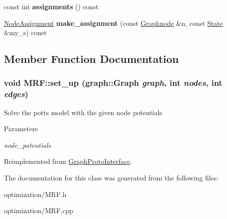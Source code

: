 \begin{DoxyCompactItemize}
\item 
\hypertarget{classMRF_aaf17c4a671ea4f06553c33fca90bfa35}{
const int {\bfseries assignments} () const }
\label{classMRF_aaf17c4a671ea4f06553c33fca90bfa35}

\item 
\hypertarget{classMRF_a9326b3fd5aea915a1bb8a1ad2ac50f3f}{
\hyperlink{structNodeAssignment}{NodeAssignment} {\bfseries make\_\-assignment} (const \hyperlink{classScarab_1_1Graph_1_1Graphnode}{Graphnode} \&n, const \hyperlink{structState}{State} \&my\_\-s) const }
\label{classMRF_a9326b3fd5aea915a1bb8a1ad2ac50f3f}

\end{DoxyCompactItemize}


\subsection{Member Function Documentation}
\hypertarget{classMRF_a928f19f948fa97796462fd9542a985fd}{
\subsubsection[{set\_\-up}]{\setlength{\rightskip}{0pt plus 5cm}void MRF::set\_\-up ({\bf graph::Graph} {\em graph}, \/  int {\em nodes}, \/  int {\em edges})}}
\label{classMRF_a928f19f948fa97796462fd9542a985fd}
Solve the potts model with the given node potentials


\begin{DoxyParams}{Parameters}
\item[{\em node\_\-potentials}]\end{DoxyParams}


Reimplemented from \hyperlink{classGraphProtoInterface}{GraphProtoInterface}.



The documentation for this class was generated from the following files:\begin{DoxyCompactItemize}
\item 
optimization/MRF.h\item 
optimization/MRF.cpp\end{DoxyCompactItemize}
